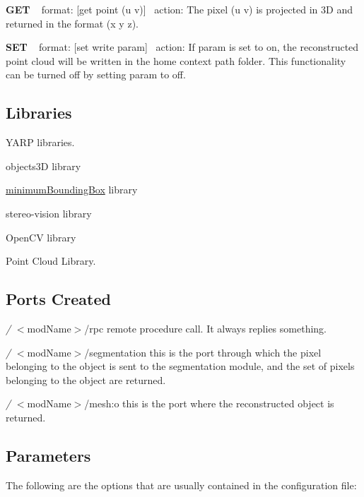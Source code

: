 {\bfseries G\+E\+T} ~\newline
format\+: \mbox{[}get point (u v)\mbox{]}~\newline
action\+: The pixel (u v) is projected in 3\+D and returned in the format (x y z).

{\bfseries S\+E\+T} ~\newline
format\+: \mbox{[}set write param\mbox{]}~\newline
action\+: If param is set to on, the reconstructed point cloud will be written in the home context path folder. This functionality can be turned off by setting param to off.\hypertarget{group__handIKModule_lib_sec}{}\subsection{Libraries}\label{group__handIKModule_lib_sec}

\begin{DoxyItemize}
\item Y\+A\+R\+P libraries.
\item objects3\+D library
\item \hyperlink{group__minimumBoundingBox}{minimum\+Bounding\+Box} library
\item stereo-\/vision library
\item Open\+C\+V library
\item Point Cloud Library.
\end{DoxyItemize}\hypertarget{group__handIKModule_portsc_sec}{}\subsection{Ports Created}\label{group__handIKModule_portsc_sec}

\begin{DoxyItemize}
\item {\itshape /} $<$mod\+Name$>$/rpc remote procedure call. It always replies something.
\item {\itshape /} $<$mod\+Name$>$/segmentation this is the port through which the pixel belonging to the object is sent to the segmentation module, and the set of pixels belonging to the object are returned.
\item {\itshape /} $<$mod\+Name$>$/mesh\+:o this is the port where the reconstructed object is returned.
\end{DoxyItemize}\hypertarget{group__handIKModule_parameters_sec}{}\subsection{Parameters}\label{group__handIKModule_parameters_sec}
The following are the options that are usually contained in the configuration file\+:

